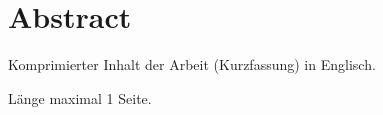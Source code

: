 \chapter{Abstract}

Komprimierter Inhalt der Arbeit (Kurzfassung) in Englisch. 

Länge maximal 1 Seite. 





















